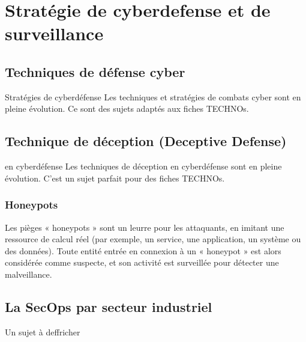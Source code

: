 
\section{Stratégie de cyberdefense et de surveillance}

\subsection{Techniques de défense cyber}

\begin{warningbox}{Stratégies de cyberdéfense}
Les techniques et stratégies de combats cyber sont en pleine évolution. Ce sont des sujets adaptés aux fiches TECHNOs.
\end{warningbox}

\subsection{Technique de déception (Deceptive Defense)}

\begin{warningbox}{ en cyberdéfense}
Les techniques de déception en cyberdéfense sont en pleine évolution. C'est un sujet parfait pour des fiches TECHNOs.
\end{warningbox}

\subsubsection{Honeypots}

Les pièges « honeypots » sont un leurre pour les attaquants, en imitant une ressource de calcul réel (par exemple, un service, une application, un système ou des données). Toute entité entrée en connexion à un « honeypot » est alors considérée comme suspecte, et son activité est surveillée pour détecter une malveillance.


\subsection{La SecOps par secteur industriel}

Un sujet à deffricher 






